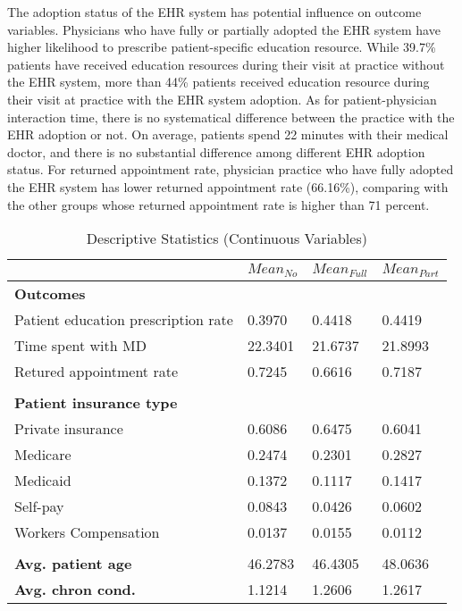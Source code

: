 \documentclass[12pt]{report}
\begin{document}
The adoption status of the EHR system has potential influence on outcome variables. Physicians who have fully or partially adopted the EHR system have higher likelihood to prescribe patient-specific education resource. While 39.7\% patients have received education resources during their visit at practice without the EHR system, more than 44\% patients received education resource during their visit at practice with the EHR system adoption. As for patient-physician interaction time, there is no systematical difference between the practice with the EHR adoption or not. On average, patients spend 22 minutes with their medical doctor, and there is no substantial difference among different EHR adoption status. For returned appointment rate, physician practice who have fully adopted the EHR system has lower returned appointment rate (66.16\%), comparing with the other groups whose returned appointment rate is higher than 71 percent.


\begin{table}[h]
\footnotesize 
\centering
\caption{Descriptive Statistics (Continuous Variables)}

\label{tab:desc2}

\begin{tabular}{@{}llll@{}}
\toprule
                                    & $Mean_{No}$ & $Mean_{Full}$ & $Mean_{Part}$ \\ \midrule
\textbf{Outcomes}                   &           &             &             \\
Patient education prescription rate & 0.3970    & 0.4418      & 0.4419      \\
Time spent with MD                  & 22.3401   & 21.6737     & 21.8993     \\
Retured appointment rate            & 0.7245    & 0.6616      & 0.7187      \\
                                    &           &             &             \\
\textbf{Patient insurance type}     &           &             &             \\
Private insurance                   & 0.6086    & 0.6475      & 0.6041      \\
Medicare                            & 0.2474    & 0.2301      & 0.2827      \\
Medicaid                            & 0.1372    & 0.1117      & 0.1417      \\
Self-pay                            & 0.0843    & 0.0426      & 0.0602      \\
Workers Compensation                & 0.0137    & 0.0155      & 0.0112      \\
                                    &           &             &             \\
\textbf{Avg. patient age}           & 46.2783   & 46.4305     & 48.0636     \\
\textbf{Avg. chron cond.}           & 1.1214    & 1.2606      & 1.2617      \\ \bottomrule
\end{tabular}
\end{table}



\newpage


\end{document}
